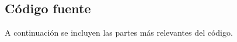  \subsection{Código fuente}
A continuación se incluyen las partes más relevantes del código.\\


%
%
%